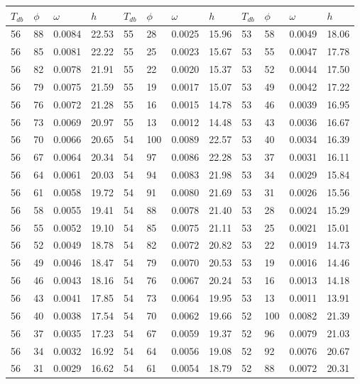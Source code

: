 \begin{tabular}{llll|llll|llll}
 \toprule 
\(T_{db}\) & \(\phi\) & \(\omega\) & \(h\) & \(T_{db}\) & \(\phi\) & \(\omega\) & \(h\) & \(T_{db}\) & \(\phi\) & \(\omega\) & \(h\)  \\ \midrule 
56 & 88 & 0.0084 & 22.53 & 55 & 28 & 0.0025 & 15.96 & 53 & 58 & 0.0049 & 18.06\\
56 & 85 & 0.0081 & 22.22 & 55 & 25 & 0.0023 & 15.67 & 53 & 55 & 0.0047 & 17.78\\
56 & 82 & 0.0078 & 21.91 & 55 & 22 & 0.0020 & 15.37 & 53 & 52 & 0.0044 & 17.50\\
56 & 79 & 0.0075 & 21.59 & 55 & 19 & 0.0017 & 15.07 & 53 & 49 & 0.0042 & 17.22\\
56 & 76 & 0.0072 & 21.28 & 55 & 16 & 0.0015 & 14.78 & 53 & 46 & 0.0039 & 16.95\\
56 & 73 & 0.0069 & 20.97 & 55 & 13 & 0.0012 & 14.48 & 53 & 43 & 0.0036 & 16.67\\
56 & 70 & 0.0066 & 20.65 & 54 & 100 & 0.0089 & 22.57 & 53 & 40 & 0.0034 & 16.39\\
56 & 67 & 0.0064 & 20.34 & 54 & 97 & 0.0086 & 22.28 & 53 & 37 & 0.0031 & 16.11\\
56 & 64 & 0.0061 & 20.03 & 54 & 94 & 0.0083 & 21.98 & 53 & 34 & 0.0029 & 15.84\\
56 & 61 & 0.0058 & 19.72 & 54 & 91 & 0.0080 & 21.69 & 53 & 31 & 0.0026 & 15.56\\
56 & 58 & 0.0055 & 19.41 & 54 & 88 & 0.0078 & 21.40 & 53 & 28 & 0.0024 & 15.29\\
56 & 55 & 0.0052 & 19.10 & 54 & 85 & 0.0075 & 21.11 & 53 & 25 & 0.0021 & 15.01\\
56 & 52 & 0.0049 & 18.78 & 54 & 82 & 0.0072 & 20.82 & 53 & 22 & 0.0019 & 14.73\\
56 & 49 & 0.0046 & 18.47 & 54 & 79 & 0.0070 & 20.53 & 53 & 19 & 0.0016 & 14.46\\
56 & 46 & 0.0043 & 18.16 & 54 & 76 & 0.0067 & 20.24 & 53 & 16 & 0.0013 & 14.18\\
56 & 43 & 0.0041 & 17.85 & 54 & 73 & 0.0064 & 19.95 & 53 & 13 & 0.0011 & 13.91\\
56 & 40 & 0.0038 & 17.54 & 54 & 70 & 0.0062 & 19.66 & 52 & 100 & 0.0082 & 21.39\\
56 & 37 & 0.0035 & 17.23 & 54 & 67 & 0.0059 & 19.37 & 52 & 96 & 0.0079 & 21.03\\
56 & 34 & 0.0032 & 16.92 & 54 & 64 & 0.0056 & 19.08 & 52 & 92 & 0.0076 & 20.67\\
56 & 31 & 0.0029 & 16.62 & 54 & 61 & 0.0054 & 18.79 & 52 & 88 & 0.0072 & 20.31\\

\end{tabular}
